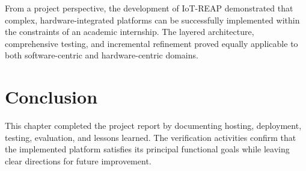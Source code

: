 From a project perspective, the development of IoT-REAP demonstrated that complex, hardware-integrated platforms can be successfully implemented within the constraints of an academic internship. The layered architecture, comprehensive testing, and incremental refinement proved equally applicable to both software-centric and hardware-centric domains.

\section*{Conclusion}

This chapter completed the project report by documenting hosting, deployment, testing, evaluation, and lessons learned. The verification activities confirm that the implemented platform satisfies its principal functional goals while leaving clear directions for future improvement.

\cleardoublepage
